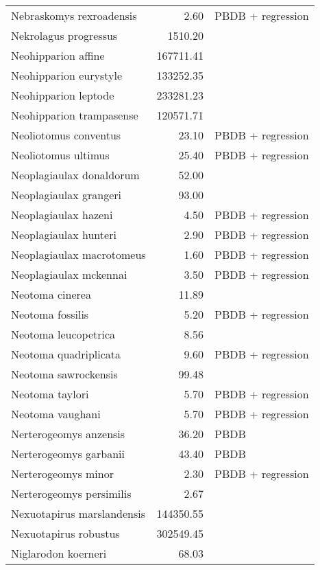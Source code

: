 \begin{table}[ht]
\begin{tabular}{lrl}
  Nebraskomys rexroadensis & 2.60 & PBDB + regression \\ 
  Nekrolagus progressus & 1510.20 & \cite{Tomiya2013} \\ 
  Neohipparion affine & 167711.41 & \cite{Tomiya2013} \\ 
  Neohipparion eurystyle & 133252.35 & \cite{Tomiya2013} \\ 
  Neohipparion leptode & 233281.23 & \cite{Tomiya2013} \\ 
  Neohipparion trampasense & 120571.71 & \cite{Tomiya2013} \\ 
  Neoliotomus conventus & 23.10 & PBDB + regression \\ 
  Neoliotomus ultimus & 25.40 & PBDB + regression \\ 
  Neoplagiaulax donaldorum & 52.00 & \cite{Wilson2012} \\ 
  Neoplagiaulax grangeri & 93.00 & \cite{Wilson2012} \\ 
  Neoplagiaulax hazeni & 4.50 & PBDB + regression \\ 
  Neoplagiaulax hunteri & 2.90 & PBDB + regression \\ 
  Neoplagiaulax macrotomeus & 1.60 & PBDB + regression \\ 
  Neoplagiaulax mckennai & 3.50 & PBDB + regression \\ 
  Neotoma cinerea & 11.89 & \cite{Smith2004} \\ 
  Neotoma fossilis & 5.20 & PBDB + regression \\ 
  Neotoma leucopetrica & 8.56 & \cite{Grohe2010} \\ 
  Neotoma quadriplicata & 9.60 & PBDB + regression \\ 
  Neotoma sawrockensis & 99.48 & \cite{Tomiya2013} \\ 
  Neotoma taylori & 5.70 & PBDB + regression \\ 
  Neotoma vaughani & 5.70 & PBDB + regression \\ 
  Nerterogeomys anzensis & 36.20 & PBDB \\ 
  Nerterogeomys garbanii & 43.40 & PBDB \\ 
  Nerterogeomys minor & 2.30 & PBDB + regression \\ 
  Nerterogeomys persimilis & 2.67 & \cite{Grohe2010} \\ 
  Nexuotapirus marslandensis & 144350.55 & \cite{Tomiya2013} \\ 
  Nexuotapirus robustus & 302549.45 & \cite{Tomiya2013} \\ 
  Niglarodon koerneri & 68.03 & \cite{Tomiya2013} \\ 

\end{tabular}
\end{table}
